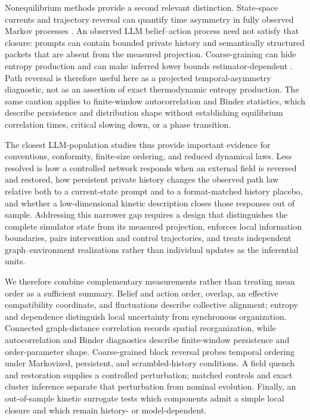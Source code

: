 \documentclass[12pt]{article}
\begin{document}
Nonequilibrium methods provide a second relevant distinction.  State-space
currents and trajectory reversal can quantify time asymmetry in fully observed
Markov processes \cite{seifert2012,roldan2012}.
An observed LLM belief--action process need not satisfy that closure: prompts
can contain bounded private history and semantically structured packets that
are absent from the measured projection.  Coarse-graining can hide entropy
production and can make inferred lower bounds estimator-dependent
\cite{kawaguchi2013,busiello2019}.  Path reversal is therefore
useful here as a projected temporal-asymmetry diagnostic, not as an assertion
of exact thermodynamic entropy production.  The same caution applies to
finite-window autocorrelation and Binder statistics, which describe
persistence and distribution shape without establishing equilibrium
correlation times, critical slowing down, or a phase transition.

The closest LLM-population studies thus provide important evidence for
conventions, conformity, finite-size ordering, and reduced dynamical laws.
Less resolved is how a controlled network responds when an external field is
reversed and restored, how persistent private history changes the observed
path law relative both to a current-state prompt and to a format-matched
history placebo, and whether a low-dimensional kinetic description closes
those responses out of sample.  Addressing this narrower gap requires a design
that distinguishes the complete simulator state from its measured projection,
enforces local information boundaries, pairs intervention and control
trajectories, and treats independent graph--environment realizations rather
than individual updates as the inferential units.

We therefore combine complementary measurements rather than treating mean
order as a sufficient summary.  Belief and action order, overlap, an effective
compatibility coordinate, and fluctuations describe collective alignment;
entropy and dependence distinguish local uncertainty from synchronous
organization.  Connected graph-distance correlation records spatial
reorganization, while autocorrelation and Binder diagnostics describe
finite-window persistence and order-parameter shape.  Coarse-grained block
reversal probes temporal ordering under Markovized, persistent, and
scrambled-history conditions.  A field quench and restoration supplies a
controlled perturbation; matched controls and exact cluster inference separate
that perturbation from nominal evolution.  Finally, an out-of-sample kinetic
surrogate tests which components admit a simple local closure and which remain
history- or model-dependent.
\end{document}
